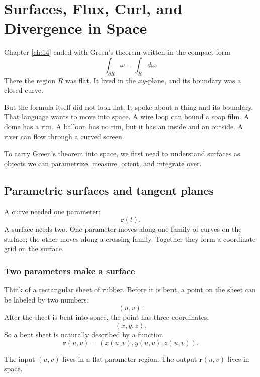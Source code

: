 
\chapter{Surfaces, Flux, Curl, and Divergence in Space}
\label{ch:15}

Chapter \ref{ch:14} ended with Green's theorem written in the compact form
\[
    \int_{\partial R}\omega=\int_R d\omega.
\]
There the region \(R\) was flat.  It lived in the \(xy\)-plane, and its boundary was a
closed curve.

But the formula itself did not look flat.  It spoke about a thing and its boundary.
That language wants to move into space.  A wire loop can bound a soap film.  A dome
has a rim.  A balloon has no rim, but it has an inside and an outside.  A river can flow
through a curved screen.

To carry Green's theorem into space, we first need to understand surfaces as objects
we can parametrize, measure, orient, and integrate over.

\section{Parametric surfaces and tangent planes}
\label{sec:15.1}

A curve needed one parameter:
\[
    \mathbf r(t).
\]
A surface needs two.  One parameter moves along one family of curves on the surface;
the other moves along a crossing family.  Together they form a coordinate grid on the
surface.

\subsection{Two parameters make a surface}

Think of a rectangular sheet of rubber.  Before it is bent, a point on the sheet can be
labeled by two numbers:
\[
    (u,v).
\]
After the sheet is bent into space, the point has three coordinates:
\[
    (x,y,z).
\]
So a bent sheet is naturally described by a function
\[
    \mathbf r(u,v)=(x(u,v),y(u,v),z(u,v)).
\]

The input \((u,v)\) lives in a flat parameter region.  The output \(\mathbf r(u,v)\)
lives in space.

